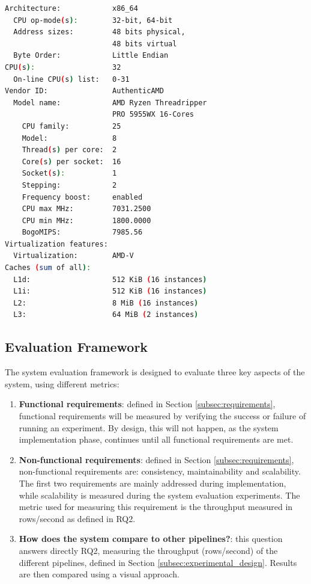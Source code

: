 \begin{lstlisting}[language=bash, caption={Output of a \textit{lscpu} bash command on the test environment.}, label={lst:cpu_snurran}, frame=tb]
Architecture:            x86_64
  CPU op-mode(s):        32-bit, 64-bit
  Address sizes:         48 bits physical, 
                         48 bits virtual
  Byte Order:            Little Endian
CPU(s):                  32
  On-line CPU(s) list:   0-31
Vendor ID:               AuthenticAMD
  Model name:            AMD Ryzen Threadripper 
                         PRO 5955WX 16-Cores
    CPU family:          25
    Model:               8
    Thread(s) per core:  2
    Core(s) per socket:  16
    Socket(s):           1
    Stepping:            2
    Frequency boost:     enabled
    CPU max MHz:         7031.2500
    CPU min MHz:         1800.0000
    BogoMIPS:            7985.56
Virtualization features: 
  Virtualization:        AMD-V
Caches (sum of all):     
  L1d:                   512 KiB (16 instances)
  L1i:                   512 KiB (16 instances)
  L2:                    8 MiB (16 instances)
  L3:                    64 MiB (2 instances)
\end{lstlisting}

\subsection{Evaluation Framework}
%

The system evaluation framework is designed to evaluate three key aspects of the system, using different metrics:
\begin{enumerate}
    \item \textbf{Functional requirements}: defined in Section \ref{subsec:requirements}, functional requirements will be measured by verifying the success or failure of running an experiment. By design, this will not happen, as the system implementation phase, continues until all functional requirements are met.
    \item \textbf{Non-functional requirements}: defined in Section \ref{subsec:requirements}, non-functional requirements are: consistency, maintainability and scalability. The first two requirements are mainly addressed during implementation, while scalability is measured during the system evaluation experiments. The metric used for measuring this requirement is the throughput measured in rows/second as defined in RQ2.
    \item \textbf{How does the system compare to other pipelines?}: this question answers directly RQ2, measuring the throughput (rows/second) of the different pipelines, defined in Section \ref{subsec:experimental_design}. Results are then compared using a visual approach.
\end{enumerate} 

